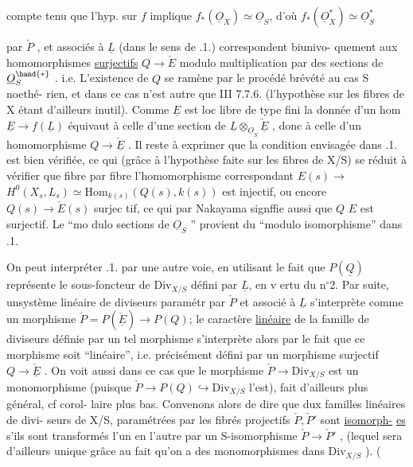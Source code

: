 compte tenu que l'hyp. sur $f$ implique $f_*(\underline{O}_X)\simeq\underline{O}_S$, d'où $f_*(\underline{O}_X^*)\simeq\underline{O}_S^*$

par $\check{P}$ , et associés à $\underline{L}$ (dans le sens de \hand{\S}.1.) correspondent biunivo-%
quement aux\hand{*} homomorphismes \uline{surjectifs} $Q\longrightarrow\check{E}$\hand{,} modulo multiplication par des sections de $\underline{O}_S^{\hand{*}}$ .\hand{\unsure{$\blacktriangledown$}}
i.e. 
L'existence de $Q$ se ramène par le procédé brévété au cas S noethé-%
rien, et dans ce cas n'est autre que III 7.7.6. (l'hypothèse sur les
fibres de X étant d'ailleurs inutil). Comme $\underline{E}$ est loc libre de type fini
la donnée d'un hom $\underline{E}\longrightarrow f(\underline{L})$ équivaut à celle d'une section de
$\underline{L}\otimes_{\underline{O}_S}\check{\underline{E}}$ , donc à celle d'un homomorphisme $Q\longrightarrow\check{\underline{E}}$ . Il reste à exprimer
que la condition envisagée dans \hand{\S}.1. est bien vérifiée, ce qui (grâce à
l'hypothèse faite sur les fibres de X/S) se réduit à vérifier que
fibre par fibre l'homomorphisme correspondant $E(s)\longrightarrow$ \hand{$\vee$}
$H^0(X_s,L_s)\simeq\mathrm{Hom}_{k(s)}(Q(s),k(s))$ est injectif, ou encore $Q(s)\longrightarrow\check{E}(s)$ surjec%
tif, ce qui par Nakayama signffie aussi que $Q$ \quad $E$ est surjectif. Le ``mo
dulo sections de $\underline{O}_S$ '' provient du ``modulo isomorphisme'' dans \hand{\S}.1.\hand{/}

On peut interpréter \hand{\S}.1. par une autre voie, en utilisant le fait
que $P(\underline{Q})$ représente le  sous-foncteur de $\mathrm{Div}_{X/S}$ défini par
$\underline{L}$, en v ertu du n$^{\circ}$2. Par suite, unsystème linéaire de diviseurs paramétr
par $\check{P}$ et associé à $\underline{L}$ s'interprète comme un morphisme $\check{P} = P(\check{\underline{E}})\longrightarrow P(Q)$; le caractère
\uline{linéaire} de la famille de diviseurs définie par un tel morphisme
s'interprète alors par le fait que ce morphisme soit ``linéaire'', i.e.
précisément défini par un morphisme surjectif $Q\longrightarrow\check{\underline{E}}$ . \hand{$\ulcorner$} On voit aussi
dans ce cas que le morphisme $\check{P}\longrightarrow\mathrm{Div}_{X/S}$ est un monomorphisme 
(puisque $\check{P}\longrightarrow P(Q)\hookrightarrow\mathrm{Div}_{X/S}$ l'est), fait d'ailleurs plus général, cf corol-%
laire plus bas. Convenons alors de dire que dux familles linéaires de divi-%
seurs de X/S, paramétrées par les fibrés projectifs $\check{P},\check{P}'$ sont \uline{isomorph-}%
\uline{es} s'ils sont transformés l'un en l'autre par un S-isomorphisme $\check{P}\longrightarrow\check{P}'$ ,
(lequel sera d'ailleurs unique grâce au fait qu'on a des monomorphismes
dans $\mathrm{Div}_{X/S}$ ). 
(

